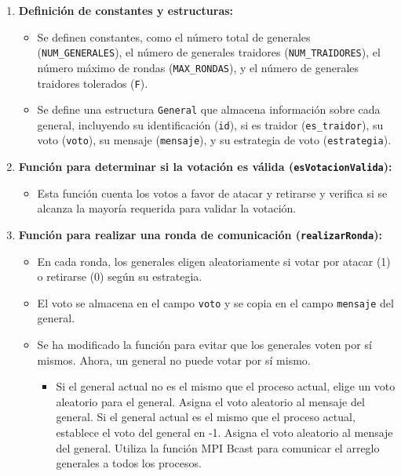 \documentclass[a4paper,12pt]{article}
\begin{document}
\begin{enumerate}
  \item \textbf{Definición de constantes y estructuras:}
  \begin{itemize}
      \item Se definen constantes, como el número total de generales (\texttt{NUM\_GENERALES}), el número de generales traidores (\texttt{NUM\_TRAIDORES}), el número máximo de rondas (\texttt{MAX\_RONDAS}), y el número de generales traidores tolerados (\texttt{F}).
      \item Se define una estructura \texttt{General} que almacena información sobre cada general, incluyendo su identificación (\texttt{id}), si es traidor (\texttt{es\_traidor}), su voto (\texttt{voto}), su mensaje (\texttt{mensaje}), y su estrategia de voto (\texttt{estrategia}).
  \end{itemize}
  
  \item \textbf{Función para determinar si la votación es válida (\texttt{esVotacionValida}):}
  \begin{itemize}
      \item Esta función cuenta los votos a favor de atacar y retirarse y verifica si se alcanza la mayoría requerida para validar la votación.
  \end{itemize}
  
  \item \textbf{Función para realizar una ronda de comunicación (\texttt{realizarRonda}):}
  \begin{itemize}
      \item En cada ronda, los generales eligen aleatoriamente si votar por atacar (1) o retirarse (0) según su estrategia.
      \item El voto se almacena en el campo \texttt{voto} y se copia en el campo \texttt{mensaje} del general.
      \item Se ha modificado la función para evitar que los generales voten por sí mismos. Ahora, un general no puede votar por sí mismo.            
      \begin{itemize}
        \item[] Si el general actual no es el mismo que el proceso actual, elige un voto aleatorio para el general.
                Asigna el voto aleatorio al mensaje del general. Si el general actual es el mismo que el proceso actual, establece el voto del general en -1. Asigna el voto aleatorio al mensaje del general. Utiliza la función MPI Bcast para comunicar el arreglo generales a todos los procesos.
      \end{itemize}      
  \end{itemize}
  

\end{enumerate}
\end{document}
